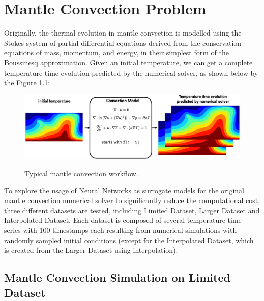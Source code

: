 \chapter{Mantle Convection Problem}\label{chap:evaluation}

Originally, the thermal evolution in mantle convection is modelled using the Stokes system of partial differential equations derived from the conservation equations of mass, momentum, and energy, in their simplest form of the Boussinesq approximation. Given an initial temperature, we can get a complete temperature time evolution predicted by the numerical solver, as shown below by the Figure \ref{figure:MC_workflow}:

\begin{figure}[H]
    \caption{Typical mantle convection workflow.}
    \includegraphics[scale=0.15]{figures/mantle_convection_images/Mantle_Convection_workflow.png}
    \label{figure:MC_workflow}
\end{figure}

To explore the usage of Neural Networks as surrogate models for the original mantle convection numerical solver to significantly reduce the computational
cost, three different datasets are tested, including Limited Dataset, Larger Dataset and Interpolated Dataset. Each dataset is composed of several temperature time-series with 100 timestamps each resulting from numerical simulations with randomly sampled initial conditions (except for the Interpolated Dataset, which is created from the Larger Dataset using interpolation).

\section{Mantle Convection Simulation on Limited Dataset}

